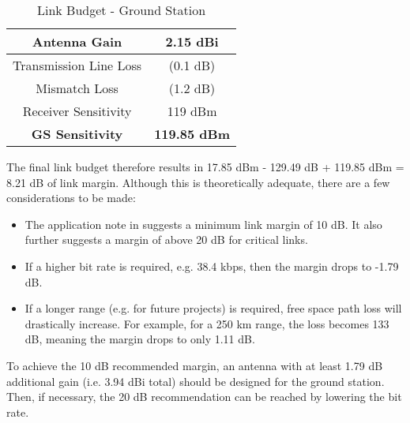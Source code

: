 \begin{table}[!htb]
  \centering
  \renewcommand{\arraystretch}{1.2}
  \begin{tabular}{ |c|c| }
  \hline
  Antenna Gain                  & 2.15 dBi                \\ \hline
  Transmission Line Loss        & (0.1 dB)                \\ \hline
  Mismatch Loss                 & (1.2 dB)                \\ \hline
  Receiver Sensitivity          & 119 dBm                 \\ \hline
  \textbf{GS Sensitivity}       & \textbf{119.85 dBm}     \\ \hline
  \end{tabular}
  \caption{Link Budget - Ground Station}
  \label{tab:link_budget_gs}
\end{table}

The final link budget therefore results in 17.85 dBm - 129.49 dB + 119.85 dBm = 8.21 dB of link margin. Although this is theoretically adequate, there are a few considerations to be made:
\begin{itemize}
    \item The application note in \cite{paper-linkBudget} suggests a minimum link margin of 10 dB. It also further suggests a margin of above 20 dB for critical links.
    \item If a higher bit rate is required, e.g. 38.4 kbps, then the margin drops to -1.79 dB.
    \item If a longer range (e.g. for future projects) is required, free space path loss will drastically increase. For example, for a 250 km range, the loss becomes 133 dB, meaning the margin drops to only 1.11 dB.
\end{itemize}

To achieve the 10 dB recommended margin, an antenna with at least 1.79 dB additional gain (i.e. 3.94 dBi total) should be designed for the ground station. Then, if necessary, the 20 dB recommendation can be reached by lowering the bit rate.